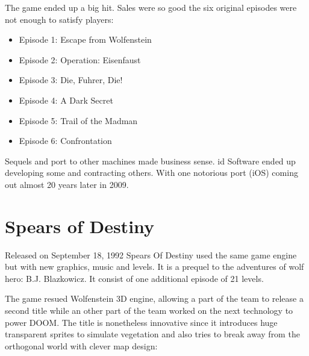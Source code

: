 \documentclass[book.tex]{subfiles}
\begin{document}
The game ended up a big hit. Sales were so good the six original episodes were not enough to satisfy players:\\
\par
\begin{itemize}
\item Episode 1: Escape from Wolfenstein
\item Episode 2: Operation: Eisenfaust
\item Episode 3: Die, Fuhrer, Die!
\item Episode 4: A Dark Secret
\item Episode 5: Trail of the Madman
\item Episode 6: Confrontation
\end{itemize}
Sequels and port to other machines made business sense. id Software ended up developing some and contracting others. With one notorious port (iOS) coming out almost 20 years later in 2009.

\section{Spears of Destiny}
Released on September 18, 1992 Spears Of Destiny used the same game engine but with new graphics, music and levels. It is a prequel to the adventures of wolf hero: B.J. Blazkowicz. It consist of one additional episode of 21 levels.\\
   \par
\begin{figure}[H]
\centering
 \end{figure}
 \par
 The game resued Wolfenstein 3D engine, allowing a part of the team to release a second title while an other part of the team worked on the next technology to power DOOM. The title is nonetheless innovative since it introduces huge transparent sprites to simulate vegetation and also tries to break away from the orthogonal world with clever map design:
    \par
\begin{figure}[H]
\centering
 \end{figure}
 \par


   \par
\begin{figure}[H]
\centering
 \end{figure}
 \par
\end{document}
